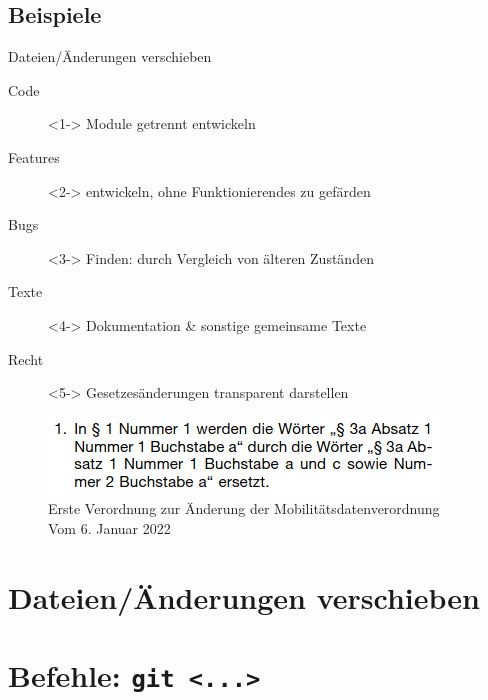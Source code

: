 \subsection{Beispiele}
\begin{frame}{Dateien/Änderungen verschieben}
	\begin{description}
		\item[Code]<1-> Module getrennt entwickeln
		\item[Features]<2-> entwickeln, ohne Funktionierendes zu gefärden
		\item[Bugs]<3-> Finden: durch Vergleich von älteren Zuständen
		\item[Texte]<4-> Dokumentation \& sonstige gemeinsame Texte
		\item[Recht]<5-> Gesetzesänderungen transparent darstellen
	\end{description}
	\begin{figure}
		\includegraphics[width=.5\linewidth]{verordnung.png}
		\caption{Erste Verordnung zur Änderung der Mobilitätsdatenverordnung
		Vom 6. Januar 2022}
		\label{fig:verordnung}
	\end{figure}
\end{frame}

\section{Dateien/Änderungen verschieben}
\section{Befehle: {\tt git <...>}}
